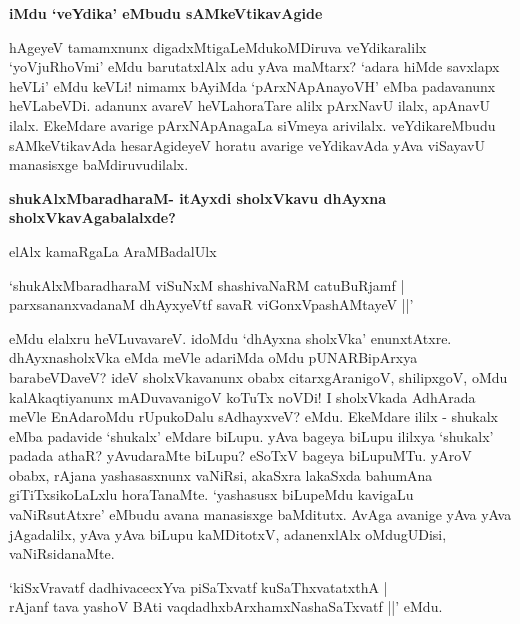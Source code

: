 {\bigskip
\noindent
{\large\bf iMdu `veYdika' eMbudu sAMkeVtikavAgide}}\label{page206}
\medskip

\noindent
hAgeyeV tamamxnunx digadxMtigaLeMdukoMDiruva veYdikaralilx `yoVjuRhoVmi' eMdu barutatxlAlx adu yAva maMtarx? `adara hiMde savxlapx heVLi' eMdu keVLi! nimamx bAyiMda `pArxNApAnayoVH' eMba padavanunx heVLabeVDi. adanunx avareV heVLahoraTare alilx pArxNavU ilalx, apAnavU ilalx. EkeMdare avarige pArxNApAnagaLa siVmeya arivilalx. veYdikareMbudu sAMkeVtikavAda hesarAgideyeV horatu avarige veYdikavAda yAva viSayavU manasisxge baMdiruvudilalx.

{\bigskip
\noindent
{\large\bf shukAlxMbaradharaM- itAyxdi sholxVkavu dhAyxna sholxVkavAgabalalxde?}}\label{page206}
\medskip

\noindent
elAlx kamaRgaLa AraMBadalUlx

\begin{shloka}
`shukAlxMbaradharaM viSuNxM shashivaNaRM catuBuRjamf |\\\label{157}
parxsananxvadanaM dhAyxyeVtf savaR viGonxVpashAMtayeV ||'
\end{shloka}

\noindent
eMdu elalxru heVLuvavareV. idoMdu `dhAyxna sholxVka' enunxtAtxre. dhAyxnasholxVka eMda meVle adariMda oMdu pUNARBipArxya barabeVDaveV? ideV sholxVkavanunx obabx citarxgAranigoV, shilipxgoV, oMdu kalAkaqtiyanunx mADuvavanigoV koTuTx noVDi! I sholxVkada AdhArada meVle EnAdaroMdu rUpukoDalu sAdhayxveV? eMdu. EkeMdare ililx - shukalx eMba padavide `shukalx' eMdare biLupu. yAva bageya biLupu ililxya `shukalx' padada athaR? yAvudaraMte biLupu? eSoTxV bageya biLu\-puMTu. yAroV obabx, rAjana yashasasxnunx vaNiRsi, akaSxra lakaSxda bahumAna giTiTxsikoLaLxlu horaTanaMte. `yasha\-susx biLupeMdu kavigaLu vaNiRsutAtxre' eMbudu avana manasisxge baMditutx. AvAga avanige yAva yAva jAgadalilx, yAva yAva biLupu kaMDitotxV, adanenxlAlx oMdugUDisi, vaNiRsidanaMte.

\begin{shloka}
`kiSxVravatf dadhivacecxYva piSaTxvatf kuSaThxvatatxthA |\\\label{207}
rAjanf tava yashoV BAti vaqdadhxbArxhamxNashaSaTxvatf ||' eMdu.
\end{shloka}

